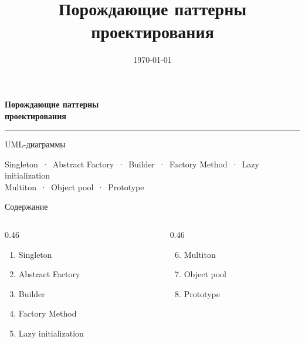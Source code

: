 \documentclass[aspectratio=169,10pt]{beamer}
\title{Порождающие паттерны проектирования}
\date{\today}
\begin{document}
\begin{frame}[plain]
  \vfill
  \centering
  {\color{main}\fontsize{26}{31}\selectfont\bfseries Порождающие паттерны\\проектирования\par}
  \vspace{5mm}
  {\color{accent}\rule{6cm}{1.2pt}\par}
  \vspace{5mm}
  {\large UML-диаграммы\par}
  \vspace{7mm}
  {\small Singleton \,·\, Abstract Factory \,·\, Builder \,·\, Factory Method \,·\,
   Lazy initialization\\[1mm]
   Multiton \,·\, Object pool \,·\, Prototype\par}
  \vfill
\end{frame}

\begin{frame}{Содержание}
  \begin{columns}[T]
    \begin{column}{0.46\textwidth}
      \begin{enumerate}\setlength\itemsep{3pt}
        \item Singleton
        \item Abstract Factory
        \item Builder
        \item Factory Method
        \item Lazy initialization
      \end{enumerate}
    \end{column}
    \begin{column}{0.46\textwidth}
      \begin{enumerate}\setcounter{enumi}{5}\setlength\itemsep{3pt}
        \item Multiton
        \item Object pool
        \item Prototype
      \end{enumerate}
    \end{column}
  \end{columns}
\end{frame}
\end{document}
